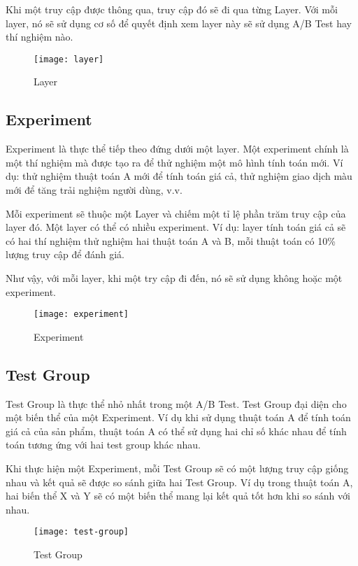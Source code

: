 Khi một truy cập được thông qua, truy cập đó sẽ đi qua từng Layer. Với mỗi layer, nó sẽ sử dụng cơ số để quyết định xem layer này sẽ sử dụng A/B Test hay thí nghiệm nào.

\begin{figure}[ht]
	\centering
	\texttt{[image: layer]}
	\caption{Layer}
\end{figure}

\subsection{Experiment}

Experiment là thực thể tiếp theo đứng dưới một layer. Một experiment chính là một thí nghiệm mà được tạo ra để thử nghiệm một mô hình tính toán mới. Ví dụ: thử nghiệm thuật toán A mới để tính toán giá cả, thử nghiệm giao dịch màu mới để tăng trải nghiệm người dùng, v.v.

Mỗi experiment sẽ thuộc một Layer và chiếm một tỉ lệ phần trăm truy cập của layer đó. Một layer có thể có nhiều experiment. Ví dụ: layer tính toán giá cả sẽ có hai thí nghiệm thử nghiệm hai thuật toán A và B, mỗi thuật toán có 10\% lượng truy cập để đánh giá.

Như vậy, với mỗi layer, khi một try cập đi đến, nó sẽ sử dụng không hoặc một experiment.

\begin{figure}[ht]
	\centering
	\texttt{[image: experiment]}
	\caption{Experiment}
\end{figure}

\subsection{Test Group}

Test Group là thực thể nhỏ nhất trong một A/B Test. Test Group đại diện cho một biến thể của một Experiment. Ví dụ khi sử dụng thuật toán A để tính toán giá cả của sản phẩm, thuật toán A có thể sử dụng hai chỉ số khác nhau để tính toán tương ứng với hai test group khác nhau.

Khi thực hiện một Experiment, mỗi Test Group sẽ có một lượng truy cập giống nhau và kết quả sẽ được so sánh giữa hai Test Group. Ví dụ trong thuật toán A, hai biến thể X và Y sẽ có một biến thể mang lại kết quả tốt hơn khi so sánh với nhau.

\begin{figure}[ht]
	\centering
	\texttt{[image: test-group]}
	\caption{Test Group}
\end{figure}

